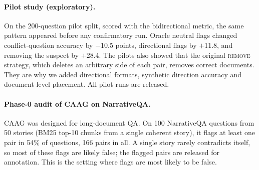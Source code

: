 \paragraph{Pilot study (exploratory).}
On the 200-question pilot split, scored with the bidirectional metric, the same pattern appeared before any
confirmatory run. Oracle neutral flags changed conflict-question accuracy by $-$10.5 points, directional flags by
$+$11.8, and removing the suspect by $+$28.4. The pilots also showed that the original \textsc{remove} strategy,
which deletes an arbitrary side of each pair, removes correct documents. They are why we added directional formats,
synthetic direction accuracy and document-level placement. All pilot runs are released.

\paragraph{Phase-0 audit of CAAG on NarrativeQA.}
CAAG was designed for long-document QA. On 100 NarrativeQA \citep{kocisky2018narrativeqa} questions from 50 stories
(BM25 top-10 chunks from a single coherent story), it flags at least one pair in 54\% of questions, 166 pairs in all.
A single story rarely contradicts itself, so most of these flags are likely false; the flagged pairs are released for
annotation. This is the setting where flags are most likely to be false.
